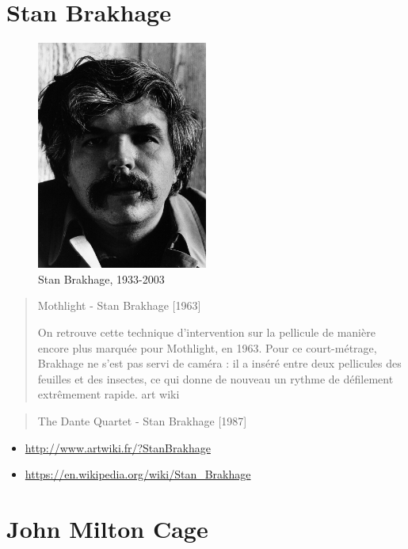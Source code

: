 \documentclass[
]{book}
\providecommand{\tightlist}{%
  \setlength{\itemsep}{0pt}\setlength{\parskip}{0pt}}
\begin{document}
\hypertarget{stan-brakhage}{%
\section{Stan Brakhage}\label{stan-brakhage}}

\begin{figure}
\centering
\includegraphics[width=0.5\textwidth,height=\textheight]{medias/corpus/brakhage/Stan_Brakhage_(circa_1976).jpg}
\caption{Stan Brakhage, 1933-2003}
\end{figure}

\begin{quote}
Mothlight - Stan Brakhage {[}1963{]}

On retrouve cette technique d'intervention sur la pellicule de manière encore plus marquée pour Mothlight, en 1963. Pour ce court-métrage, Brakhage ne s'est pas servi de caméra : il a inséré entre deux pellicules des feuilles et des insectes, ce qui donne de nouveau un rythme de défilement extrêmement rapide.
art wiki
\end{quote}

\begin{quote}
The Dante Quartet - Stan Brakhage {[}1987{]}
\end{quote}

\begin{itemize}
\tightlist
\item
  \url{http://www.artwiki.fr/?StanBrakhage}
\item
  \url{https://en.wikipedia.org/wiki/Stan_Brakhage}
\end{itemize}

\hypertarget{john-milton-cage}{%
\section{John Milton Cage}\label{john-milton-cage}}
\end{document}

